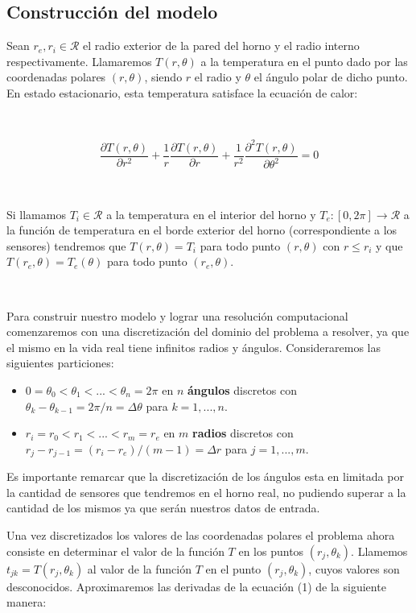 \subsection{Construcci\'on del modelo}

Sean $r_e, r_i \in \mathcal{R}$ el radio exterior de la pared del horno y el radio interno respectivamente. Llamaremos $T(r,\theta)$ a la temperatura en el punto dado por las coordenadas polares $(r,\theta)$, siendo $r$ el radio y $\theta$ el \'angulo polar de dicho punto. En estado estacionario, esta temperatura satisface la ecuaci\'on de calor:

~

\begin{equation}
 \frac{\partial T(r,\theta)}{\partial r^2} + \frac{1}{r} \frac{\partial T(r,\theta)}{\partial r} + \frac{1}{r^2} \frac{\partial^2T(r,\theta)}{\partial\theta^2} = 0
\end{equation}

~

Si llamamos $T_i \in \mathcal{R}$ a la temperatura en el interior del horno y $T_e:[0,2\pi] \rightarrow \mathcal{R}$ a la funci\'on de temperatura en el borde exterior del horno (correspondiente a los sensores) tendremos que $T(r,\theta) = T_i$ para todo punto $(r,\theta)$ con $r \leq r_i$ y que $T(r_e, \theta) = T_e(\theta)$ para todo punto $(r_e, \theta)$.

~

Para construir nuestro modelo y lograr una resoluci\'on computacional comenzaremos con una discretizaci\'on del dominio del problema a resolver, ya que el mismo en la vida real tiene infinitos radios y \'angulos. Consideraremos las siguientes particiones:

\begin{itemize}
 \item $0 = \theta_0 < \theta_1 < ... < \theta_n = 2 \pi$ en $n$ \textbf{\'angulos} discretos con $\theta_k - \theta_{k-1} = 2\pi/n = \Delta\theta$ para $k = 1,...,n$.
 \item $r_i = r_0 < r_1 < ... < r_m = r_e$ en $m$ \textbf{radios} discretos con $r_j - r_{j-1} = (r_i - r_e)/(m-1) = \Delta r$ para $j=1,...,m$.
\end{itemize}

Es importante remarcar que la discretizaci\'on de los \'angulos esta en limitada por la cantidad de sensores que tendremos en el horno real, no pudiendo superar a la cantidad de los mismos ya que ser\'an nuestros datos de entrada.

Una vez discretizados los valores de las coordenadas polares el problema ahora consiste en determinar el valor de la funci\'on $T$ en los puntos $(r_j, \theta_k)$. Llamemos $t_{jk} = T(r_j, \theta_k)$ al valor de la funci\'on $T$ en el punto $(r_j, \theta_k)$, cuyos valores son desconocidos. Aproximaremos las derivadas de la ecuaci\'on (1) de la siguiente manera:

